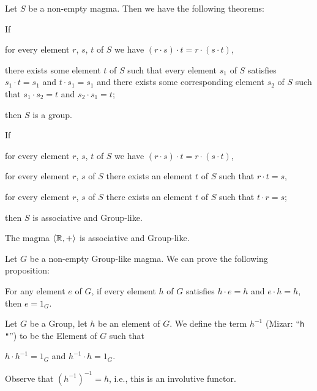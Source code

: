 Let $S$ be a non-empty magma. Then we have the following theorems:
\begin{thm}
\item\label{group1:1} If \begin{enumerate*}[label=(\roman*)]
\item for every element $r$, $s$, $t$ of $S$ we have $(r\cdot s)\cdot t=r\cdot (s\cdot t)$,
\item there exists some element $t$ of $S$ such that every element
  $s_{1}$ of $S$ satisfies $s_{1}\cdot t=s_{1}$ and $t\cdot s_{1}=s_{1}$ and there
  exists some corresponding element $s_{2}$ of $S$ such that $s_{1}\cdot s_{2}=t$ and $s_{2}\cdot s_{1}=t$;
\end{enumerate*}
  then $S$ is a group.
\item\label{group1:2} If \begin{enumerate*}[label=(\roman*)]
\item for every element $r$, $s$, $t$ of $S$ we have $(r\cdot s)\cdot t=r\cdot (s\cdot t)$,
\item for every element $r$, $s$ of $S$ there exists an element $t$ of
  $S$ such that $r\cdot t=s$,
\item for every element $r$, $s$ of $S$ there exists an element $t$ of
  $S$ such that $t\cdot r=s$;
\end{enumerate*}
  then $S$ is associative and Group-like.
\item\label{group1:3} The magma $\langle \mathbb{R},+\rangle$ is associative
  and Group-like.
\end{thm}

  
Let $G$ be a non-empty Group-like magma. We can prove the following proposition:
\begin{thm}
\item\label{group1:4} For any element $e$ of $G$, if every element $h$
  of $G$ satisfies $h\cdot e=h$ and $e\cdot h=h$, then $e=1_{G}$.
\end{thm}

\begin{definition}
Let $G$ be a Group, let $h$ be an element of $G$.
We define the term $h^{-1}$ (Mizar: ``\verb#h "#'') to be the Element of
$G$ such that
\begin{defn}
\item $h\cdot h^{-1}=1_{G}$ and $h^{-1}\cdot h = 1_{G}$.
\end{defn}
Observe that $(h^{-1})^{-1}=h$, i.e., this is an involutive functor.
\end{definition}

